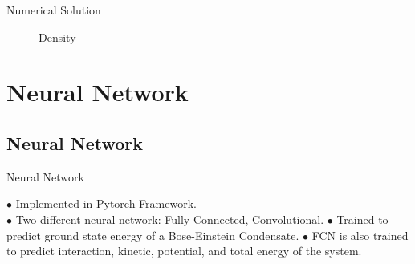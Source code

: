 \documentclass{beamer}
\begin{document}
\begin{frame}{Numerical Solution}

%        
%        
%        
%        



\begin{figure}[H]
	
    \caption{Density}
	\label{fig:a}
\end{figure}

\end{frame}


\section{Neural Network}
\subsection{Neural Network}
\begin{frame}{Neural Network}

$\bullet$ Implemented in Pytorch Framework.\\
\vskip 0.5cm
$\bullet$ Two different neural network: Fully Connected, Convolutional.
\vskip 0.5cm
$\bullet$ Trained to predict ground state energy of a Bose-Einstein Condensate.
\vskip 0.5cm
$\bullet$ FCN is also trained to predict interaction, kinetic, potential, and total energy of the system.

\end{frame}
\end{document}
